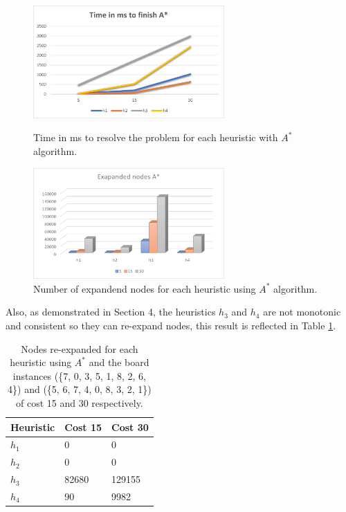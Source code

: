\documentclass[runningheads]{llncs}
\begin{document}
\begin{figure}
    \centering
    \includegraphics[width=0.65\textwidth]{seconds_A.png}
    \caption{Time in ms to resolve the problem for each heuristic with $A^*$ algorithm.} \label{fig2}
    \vspace{10pt}
    \includegraphics[width=0.65\textwidth]{expanded_nodes_A.png}
    \caption{Number of expandend nodes for each heuristic using $A^*$ algorithm.} \label{fig3}
\end{figure}
Also, as demonstrated in Section 4, the heuristics $h_3$ and $h_4$ are not monotonic and consistent so they can re-expand nodes, this result is reflected in Table \ref{tab3}.

\begin{table}
    \centering
    \caption{Nodes re-expanded for each heuristic using $A^*$ and the board instances (\{7, 0, 3, 5, 1, 8, 2, 6, 4\}) and (\{5, 6, 7, 4, 0, 8, 3, 2, 1\}) of cost 15 and 30 respectively. }\label{tab3}
    \begin{tabular}{|l|l|l|}
    \hline
    Heuristic & Cost 15 & Cost 30\\
    \hline
    $h_1$ & 0 & 0\\
    $h_2$ & 0 & 0\\
    $h_3$ & 82680 & 129155 \\
    $h_4$ & 90 & 9982\\
    \hline
    \end{tabular}
\end{table}
\end{document}
